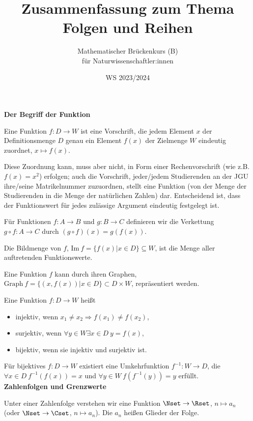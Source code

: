\documentclass[a4paper,10pt]{article}
\title{Zusammenfassung zum Thema Folgen und Reihen}
\author{Mathematischer Brückenkurs (B)\\für Naturwissenschaftler:innen}
\date{WS 2023/2024}
\begin{document}
\parindent0pt
\maketitle

{\bf Der Begriff der Funktion}

Eine Funktion $f:D\to W$ ist eine Vorschrift, die jedem Element $x$ der Definitionsmenge $D$ genau ein Element $f(x)$ der Zielmenge $W$ eindeutig zuordnet, $x\mapsto f(x)$.

Diese Zuordnung kann, muss aber nicht, in Form einer Rechenvorschrift (wie z.B. $f(x)=x^2$) erfolgen; auch die Vorschrift, jeder/jedem Studierenden an der JGU ihre/seine Matrikelnummer zuzuordnen, stellt eine Funktion (von der Menge der Studierenden in die Menge der natürlichen Zahlen) dar. Entscheidend ist, dass der Funktionswert für jedes zulässige Argument eindeutig festgelegt ist.

Für Funktionen $f:A\to B$ und $g:B\to C$ definieren wir die Verkettung
$g\circ f:A\to C$ durch $(g\circ f)(x)=g(f(x))$.

Die Bildmenge von $f$, $\textrm{Im}~f=\{f(x)|x\in D\}\subseteq W$, ist die Menge
aller auftretenden Funktionswerte.

Eine Funktion $f$ kann durch ihren Graphen,
$\textrm{Graph}~f=\{(x,f(x))|x\in D\}\subset D\times W$,
repräsentiert werden.

Eine Funktion $f:D\to W$ heißt
\begin{itemize}
\item {injektiv}, wenn $x_1\not=x_2 \Rightarrow f(x_1)\not=f(x_2)$,
\item {surjektiv}, wenn $\forall y\in W\exists x\in D~y=f(x)$,
\item {bijektiv}, wenn sie injektiv und surjektiv ist.
\end{itemize}
Für bijektives $f:D\to W$ existiert eine Umkehrfunktion $f^{-1}:W\to D$,
die $\forall x\in D~f^{-1}(f(x))=x$ und $\forall y\in W~f(f^{-1}(y))=y$ erfüllt. \\


{\bf Zahlenfolgen und Grenzwerte}

Unter einer Zahlenfolge verstehen wir eine Funktion $\Nset\to\Rset$, $n\mapsto a_n$ (oder $\Nset\to\Cset$, $n\mapsto a_n$). Die $a_n$ heißen Glieder der Folge.
\end{document}
